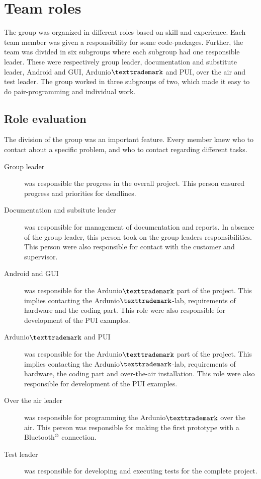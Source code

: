 \section{Team roles}
The group was organized in different roles based on skill and experience. Each team member was given a responsibility for some code-packages. Further, the team was divided in six subgroups where each subgroup had one responsible leader. These were respectively group leader, documentation and substitute leader, Android and GUI, Ardunio$\texttrademark$ and PUI, over the air and test leader. The group worked in three subgroups of two, which made it easy to do pair-programming and individual work.

\subsection{Role evaluation}
The division of the group was an important feature. Every member knew who to contact about a specific problem, and who to contact regarding different tasks.\\

\begin{description}
	\item[Group leader]{was responsible the progress in the overall project. This person ensured progress and priorities for deadlines.}
	\item[Documentation and subsitute leader]{was responsible for management of documentation and reports. In absence of the group leader, this person took on the group leaders responsibilities. This person were also responsible for contact with the customer and supervisor.}
	\item[Android and GUI]{was responsible for the Ardunio$\texttrademark$ part of the project. This implies contacting the Ardunio$\texttrademark$-lab, requirements of hardware and the coding part. This role were also responsible for development of the PUI examples.}
	\item[Ardunio$\texttrademark$ and PUI]{was responsible for the Ardunio$\texttrademark$ part of the project. This implies contacting the Ardunio$\texttrademark$-lab, requirements of hardware, the coding part and over-the-air installation. This role were also responsible for development of the PUI examples.}
	\item[Over the air leader]{was responsible for programming the Ardunio$\texttrademark$ over the air. This person was responsible for making the first prototype with a Bluetooth$\textsuperscript{\textregistered}$  connection.}
	\item[Test leader]{was responsible for developing and executing tests for the complete project.}
\end{description}

